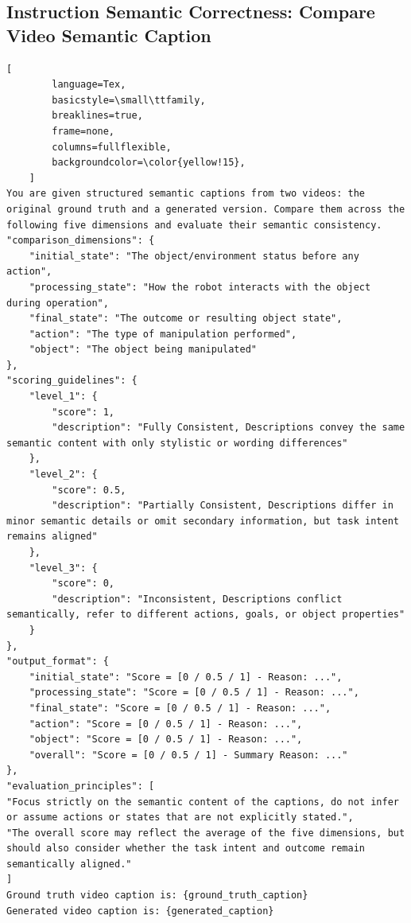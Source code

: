 \begin{tcolorbox}[
    promptstyle, 
    width=\linewidth, 
    breakable
] 
    \subsection*{Instruction Semantic Correctness: Compare Video Semantic Caption}

    \begin{lstlisting}[
        language=Tex, 
        basicstyle=\small\ttfamily,
        breaklines=true,
        frame=none, 
        columns=fullflexible,
        backgroundcolor=\color{yellow!15}, 
    ]
You are given structured semantic captions from two videos: the original ground truth and a generated version. Compare them across the following five dimensions and evaluate their semantic consistency.
"comparison_dimensions": {    
    "initial_state": "The object/environment status before any action",
    "processing_state": "How the robot interacts with the object during operation", 
    "final_state": "The outcome or resulting object state",
    "action": "The type of manipulation performed",
    "object": "The object being manipulated"
},
"scoring_guidelines": {
    "level_1": {
        "score": 1,
        "description": "Fully Consistent, Descriptions convey the same semantic content with only stylistic or wording differences"    
    },
    "level_2": {
        "score": 0.5,
        "description": "Partially Consistent, Descriptions differ in minor semantic details or omit secondary information, but task intent remains aligned"
    },
    "level_3": {
        "score": 0,
        "description": "Inconsistent, Descriptions conflict semantically, refer to different actions, goals, or object properties"
    }
},
"output_format": {
    "initial_state": "Score = [0 / 0.5 / 1] - Reason: ...",
    "processing_state": "Score = [0 / 0.5 / 1] - Reason: ...", 
    "final_state": "Score = [0 / 0.5 / 1] - Reason: ...",
    "action": "Score = [0 / 0.5 / 1] - Reason: ...",
    "object": "Score = [0 / 0.5 / 1] - Reason: ...",
    "overall": "Score = [0 / 0.5 / 1] - Summary Reason: ..."
},
"evaluation_principles": [
"Focus strictly on the semantic content of the captions, do not infer or assume actions or states that are not explicitly stated.",
"The overall score may reflect the average of the five dimensions, but should also consider whether the task intent and outcome remain semantically aligned."
]
Ground truth video caption is: {ground_truth_caption}
Generated video caption is: {generated_caption}
    \end{lstlisting}
    
\end{tcolorbox}

